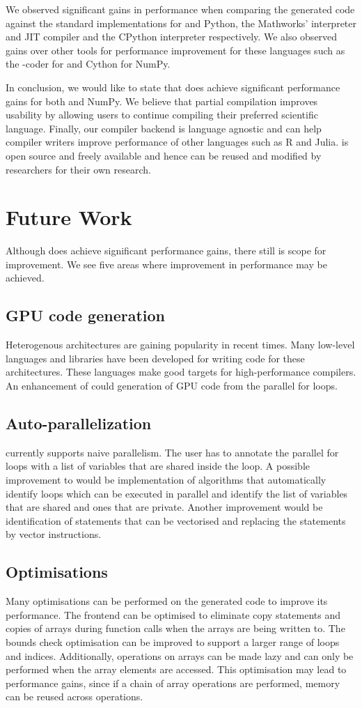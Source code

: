We observed significant gains in performance when comparing the generated code against the standard implementations for \matlab and Python, the Mathworks' \matlab interpreter and JIT compiler and the CPython interpreter respectively. We also observed gains over other tools for performance improvement for these languages such as the \matlab-coder for \matlab and Cython for NumPy.  

In conclusion, we would like to state that \velocty does achieve significant performance gains for both \matlab and NumPy. We believe that partial compilation improves usability by allowing users to continue compiling their preferred scientific language. Finally, our compiler backend is language agnostic and can help compiler writers improve performance of other languages such as R and Julia. \velocty is open source and freely available and hence can be reused and modified by researchers for their own research. 

\section{Future Work}
Although \velocty does achieve significant performance gains, there still is scope for improvement. We see five areas where improvement in performance may be achieved.
\subsection{GPU code generation}
Heterogenous architectures are gaining popularity in recent times. Many low-level languages and libraries have been developed for writing code for these architectures. These languages make good targets for high-performance compilers. An enhancement of \velocty could generation of GPU code from the parallel for loops. 
\subsection{Auto-parallelization}
\velocty currently supports naive parallelism. The user has to annotate the parallel for loops with a list of variables that are shared inside the loop. A possible improvement to \velocty would be implementation of algorithms that automatically identify loops which can be executed in parallel and identify the list of variables that are shared and ones that are private. Another improvement would be identification of statements that can be vectorised and replacing the statements by vector instructions. 
\subsection{Optimisations}
Many optimisations can be performed on the generated code to improve its performance. The \matlab frontend can be optimised to eliminate copy statements and copies of arrays  during function calls when the arrays are being written to. The bounds check optimisation can be improved to support a larger range of loops and indices. Additionally, operations on arrays can be made lazy and can only be performed when the array elements are accessed. This optimisation may lead to performance gains, since if a chain of array operations are performed, memory can be reused across operations. 
